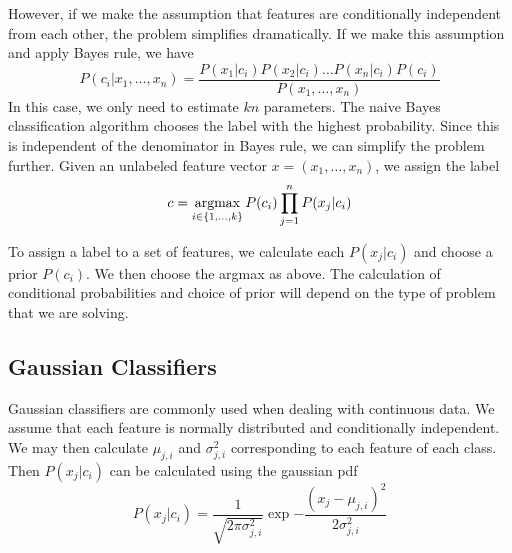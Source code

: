 However, if we make the assumption that features are conditionally independent from each other, the problem simplifies dramatically.
If we make this assumption and apply Bayes rule, we have
\[
P(c_i | x_1, \ldots, x_n) = \frac{P(x_1|c_i)P(x_2|c_i)\ldots P(x_n|c_i)P(c_i)}{P(x_1,\ldots,x_n)}
\]
In this case, we only need to estimate $kn$ parameters.
The naive Bayes classification algorithm chooses the label with the highest probability.
Since this is independent of the denominator in Bayes rule, we can simplify the problem further.
Given an unlabeled feature vector $x=(x_1,\ldots,x_n)$, we assign the label
\[
c = \underset{i \in \{1, \ldots, k\}}{\mbox{argmax}}\, P(c_i)\prod_{j=1}^n P(x_j|c_i)
\]

To assign a label to a set of features, we calculate each $P(x_j|c_i)$ and choose a prior $P(c_i)$.
We then choose the argmax as above.
The calculation of conditional probabilities and choice of prior will depend on the type of problem that we are solving.

\subsection*{Gaussian Classifiers}

Gaussian classifiers are commonly used when dealing with continuous data.
We assume that each feature is normally distributed and conditionally independent.
We may then calculate $\mu_{j,i}$ and $\sigma^2_{j,i}$ corresponding to each feature of each class.
Then $P(x_j|c_i)$ can be calculated using the gaussian pdf
\[
P(x_j|c_i) = \frac{1}{\sqrt{2\pi\sigma_{j,i}^2}}\exp{-\frac{(x_j - \mu_{j,i})^2}{2\sigma^2_{j,i}}}
\]

